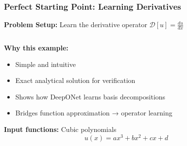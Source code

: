 \documentclass[notes]{beamer}
\begin{document}
\begin{frame}
\frametitle{Perfect Starting Point: Learning Derivatives}

\textbf{Problem Setup:} Learn the derivative operator $\mathcal{D}[u] = \frac{du}{dx}$

\begin{columns}[T]
    \begin{column}{0.5\textwidth}
        \textbf{Why this example:}
        \begin{itemize}
            \item Simple and intuitive
            \item Exact analytical solution for verification
            \item Shows how DeepONet learns basis decompositions
            \item Bridges function approximation → operator learning
        \end{itemize}
        
        \vspace{0.5cm}
        
        \textbf{Input functions:} Cubic polynomials
        \begin{equation*}
        u(x) = ax^3 + bx^2 + cx + d
        \end{equation*}
        

\end{column}
\end{columns}
\end{frame}
\end{document}
